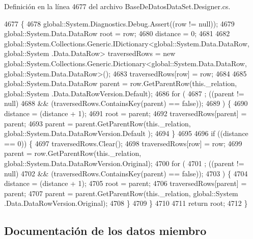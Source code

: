 Definición en la línea 4677 del archivo Base\-De\-Datos\-Data\-Set.\-Designer.\-cs.


\begin{DoxyCode}
4677                                                                                                        \{
4678                 global::System.Diagnostics.Debug.Assert((row != null));
4679                 global::System.Data.DataRow root = row;
4680                 distance = 0;
4681 
4682                 global::System.Collections.Generic.IDictionary<global::System.Data.DataRow, global::System
      .Data.DataRow> traversedRows = \textcolor{keyword}{new} global::System.Collections.Generic.Dictionary<global::System.Data.DataRow,
       global::System.Data.DataRow>();
4683                 traversedRows[row] = row;
4684 
4685                 global::System.Data.DataRow parent = row.GetParentRow(this.\_relation, global::System
      .Data.DataRowVersion.Default);
4686                 \textcolor{keywordflow}{for} (
4687                 ; ((parent != null) 
4688                             && (traversedRows.ContainsKey(parent) == \textcolor{keyword}{false})); 
4689                 ) \{
4690                     distance = (distance + 1);
4691                     root = parent;
4692                     traversedRows[parent] = parent;
4693                     parent = parent.GetParentRow(this.\_relation, global::System.Data.DataRowVersion.Default
      );
4694                 \}
4695 
4696                 \textcolor{keywordflow}{if} ((distance == 0)) \{
4697                     traversedRows.Clear();
4698                     traversedRows[row] = row;
4699                     parent = row.GetParentRow(this.\_relation, global::System.Data.DataRowVersion.Original);
4700                     \textcolor{keywordflow}{for} (
4701                     ; ((parent != null) 
4702                                 && (traversedRows.ContainsKey(parent) == \textcolor{keyword}{false})); 
4703                     ) \{
4704                         distance = (distance + 1);
4705                         root = parent;
4706                         traversedRows[parent] = parent;
4707                         parent = parent.GetParentRow(this.\_relation, global::System
      .Data.DataRowVersion.Original);
4708                     \}
4709                 \}
4710 
4711                 \textcolor{keywordflow}{return} root;
4712             \}
\end{DoxyCode}


\subsection{Documentación de los datos miembro}
